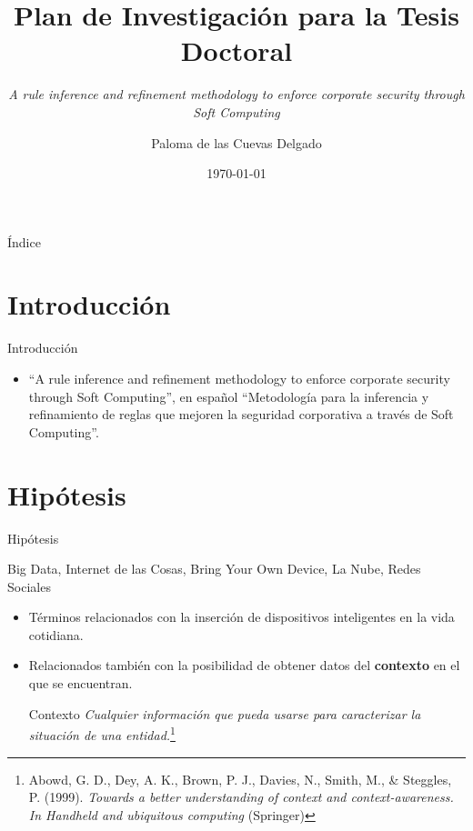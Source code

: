\documentclass{beamer}
\title[Plan de Investigación]{Plan de Investigación para la Tesis Doctoral}
\subtitle{\textit{A rule inference and refinement methodology to enforce corporate security through Soft Computing}}
\author{Paloma de las Cuevas Delgado}
\institute{Departamento de Arquitectura y Tecnología de los Computadores}
\date{\today}
\begin{document}
\begin{frame}
  \titlepage
\end{frame}

\begin{frame}{Índice}
  \tableofcontents
\end{frame}

\section{Introducción}

\begin{frame}{Introducción}

\begin{itemize}
  \item ``A rule inference and refinement methodology to enforce corporate security through Soft Computing'', en español ``Metodología para la inferencia y refinamiento de reglas que mejoren la seguridad corporativa a través de Soft Computing''.
\end{itemize}

\end{frame}

\section{Hipótesis}

\begin{frame}{Hipótesis}

\begin{block}{}
Big Data, Internet de las Cosas, Bring Your Own Device, La Nube, Redes Sociales
\end{block}

\begin{itemize}
  \item<1-> Términos relacionados con la inserción de dispositivos inteligentes en la vida cotidiana.
  \item<2-> Relacionados también con la posibilidad de obtener datos del \textbf{contexto} en el que se encuentran.
  \begin{block}{Contexto}
    \textit{Cualquier información que pueda usarse para caracterizar la situación de una entidad.}\footnote{{\scriptsize Abowd, G. D., Dey, A. K., Brown, P. J., Davies, N., Smith, M., \& Steggles, P. (1999). \textit{Towards a better understanding of context and context-awareness. In Handheld and ubiquitous computing} (Springer)}}
  \end{block}
\end{itemize}

\end{frame}
\end{document}
